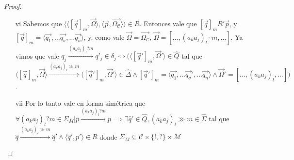 \begin{proof}
\begin{itemize}
    \item[vi]  Sabemos que $\langle \langle [\overrightarrow{q}]_m, \overrightarrow{\Omega} \rangle, \langle \overrightarrow{p}, \overrightarrow{\Omega_\mathcal{C}} \rangle \rangle \in R$. Entonces vale que $[\overrightarrow{q}]_mR'\overrightarrow{p}$, y $[\overrightarrow{q}]_m = \langle \overrightarrow{q_1}, \ldots \overrightarrow{q_\sigma}, \ldots \overrightarrow{q_n} \rangle$, y, como vale $\overrightarrow{\Omega}=\overrightarrow{\Omega_\mathcal{C}}$, $\overrightarrow{\Omega} = [\ldots, (a_ka_j)_l \cdot m, \ldots]$. Ya vimos que vale $q_j \xrightarrow{(a_ka_j)_l?m} q'_j \in \delta_j  \iff  (\langle [\overrightarrow{q}']_m, \overrightarrow{\Omega}' \rangle \in \hat{Q}$ tal que $\langle [\overrightarrow{q}]_m, \overrightarrow{\Omega} \rangle \xrightarrow{(a_ka_j)_l \gg m} \langle [\overrightarrow{q}']_m, \overrightarrow{\Omega}' \rangle \in \hat{\Delta} \land [\overrightarrow{q}']_m= \langle \overrightarrow{q_1}, \ldots \overrightarrow{q_\sigma}', \ldots \overrightarrow{q_n} \rangle \land \overrightarrow{\Omega}'= [\ldots, (a_ka_j)_l, \ldots])$.
    
    \item[vii] Por lo tanto vale en forma simétrica que $\forall (a_ka_j)_l?m \in \Sigma_M | p \xrightarrow{(a_ka_j)_l?m} p \implies \exists \hat{q}' \in \hat{Q}, (a_ka_j)_l \gg m \in \hat{\Sigma}$ tal que $\hat{q} \xrightarrow{(a_ka_j)_l \gg m} \hat{q}' \land \langle \hat{q}', p'\rangle \in R$ donde $\Sigma_M \subseteq \mathcal{C} \times \{!,?\} \times \mathcal{M}$
    
\end{itemize}
\end{proof}


